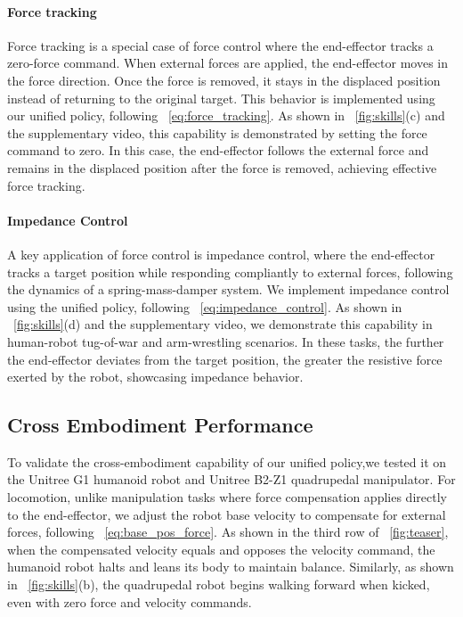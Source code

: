 \documentclass{article}
\begin{document}
\paragraph{Force tracking}
Force tracking is a special case of force control where the end-effector tracks a zero-force command. When external forces are applied, the end-effector moves in the force direction. Once the force is removed, it stays in the displaced position instead of returning to the original target. This behavior is implemented using our unified policy, following ~\cref{eq:force_tracking}. As shown in ~\cref{fig:skills}(c) and the supplementary video, this capability is demonstrated by setting the force command to zero. In this case, the end-effector follows the external force and remains in the displaced position after the force is removed, achieving effective force tracking.
\vspace{-0.10in}

\paragraph{Impedance Control}
A key application of force control is impedance control, where the end-effector tracks a target position while responding compliantly to external forces, following the dynamics of a spring-mass-damper system. We implement impedance control using the unified policy, following ~\cref{eq:impedance_control}. As shown in ~\cref{fig:skills}(d) and the supplementary video, we demonstrate this capability in human-robot tug-of-war and arm-wrestling scenarios. In these tasks, the further the end-effector deviates from the target position, the greater the resistive force exerted by the robot, showcasing impedance behavior.
\vspace{-0.05in}

\subsection{Cross Embodiment Performance}
\vspace{-0.05in}
To validate the cross-embodiment capability of our unified policy,we tested it on the Unitree G1 humanoid robot and Unitree B2-Z1 quadrupedal manipulator. For locomotion, unlike manipulation tasks where force compensation applies directly to the end-effector, we adjust the robot base velocity to compensate for external forces, following ~\cref{eq:base_pos_force}.
As shown in the third row of ~\cref{fig:teaser}, when the compensated velocity equals and opposes the velocity command, the humanoid robot halts and leans its body to maintain balance. Similarly, as shown in ~\cref{fig:skills}(b), the quadrupedal robot begins walking forward when kicked, even with zero force and velocity commands.
\vspace{-0.05in}
\end{document}
